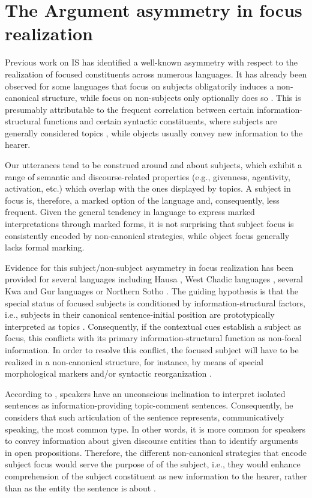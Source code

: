 \section{The Argument asymmetry in focus realization} \label{sub:2.3}

Previous work on IS has identified a well-known asymmetry with respect to the realization of focused constituents across numerous languages. 
It has already been observed for some languages that focus on subjects obligatorily induces a non-canonical structure, while focus on non-subjects only optionally does so \parencite{skopeteas2010focus}. This is presumably attributable to the frequent correlation between certain information-structural functions and certain syntactic constituents, where subjects are generally considered topics , while objects usually convey new information to the hearer.

Our utterances tend to be construed around and about subjects, which exhibit a range of semantic and discourse-related properties (e.g., givenness, agentivity, activation, etc.) which overlap with the ones displayed by topics. A subject in focus is, therefore, a marked option of the language and, consequently, less frequent. Given the general tendency in language to express marked interpretations through marked forms, it is not surprising that subject focus is consistently encoded by non-canonical strategies, while object focus generally lacks formal marking.

 Evidence for this subject/non-subject asymmetry in focus realization has been provided for several languages including Hausa \parencite{hartmann2007place}, West Chadic languages \parencite{zimmermann2011focus}, several Kwa and Gur languages \parencite{fiedler2005out} or Northern Sotho \parencite{zerbian2007investigating}.
The guiding hypothesis is that the special status of focused subjects is conditioned by information-structural factors, i.e., subjects in their canonical sentence-initial position are prototypically interpreted as topics \parencite{thompson1976subject}. Consequently, if the contextual cues establish a subject as focus, this conflicts with its primary information-structural function as non-focal information. In order to resolve this conflict, the focused subject will have to be realized in a non-canonical structure, for instance, by means of special morphological markers and/or syntactic reorganization \parencite{fiedler2006subject}. 

According to \textcite{lambrecht2010constraints}, speakers have an unconscious inclination to interpret isolated sentences as information-providing topic-comment sentences. Consequently, he considers that such articulation of the sentence represents, communicatively speaking, the most common type. In other words, it is more common for speakers to convey information about given discourse entities than to identify arguments in open propositions. Therefore, the different non-canon\-i\-cal strategies that encode subject focus would serve the purpose of  of the subject, i.e., they would enhance comprehension of the subject constituent as new information to the hearer, rather than as the entity the sentence is about \parencite{reinhart1981pragmatics}.

